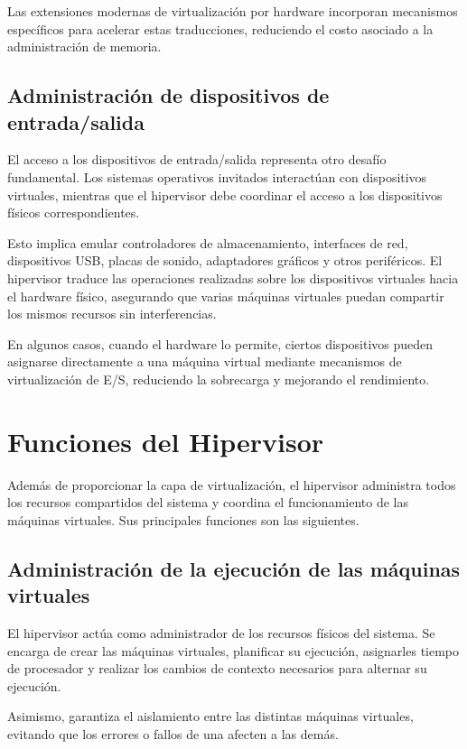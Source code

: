 Las extensiones modernas de virtualización por hardware incorporan mecanismos específicos para acelerar estas traducciones, reduciendo el costo asociado a la administración de memoria.

\subsection{Administración de dispositivos de entrada/salida}

El acceso a los dispositivos de entrada/salida representa otro desafío fundamental. Los sistemas operativos invitados interactúan con dispositivos virtuales, mientras que el hipervisor debe coordinar el acceso a los dispositivos físicos correspondientes.

Esto implica emular controladores de almacenamiento, interfaces de red, dispositivos USB, placas de sonido, adaptadores gráficos y otros periféricos. El hipervisor traduce las operaciones realizadas sobre los dispositivos virtuales hacia el hardware físico, asegurando que varias máquinas virtuales puedan compartir los mismos recursos sin interferencias.

En algunos casos, cuando el hardware lo permite, ciertos dispositivos pueden asignarse directamente a una máquina virtual mediante mecanismos de virtualización de E/S, reduciendo la sobrecarga y mejorando el rendimiento.

\section{Funciones del Hipervisor}

Además de proporcionar la capa de virtualización, el hipervisor administra todos los recursos compartidos del sistema y coordina el funcionamiento de las máquinas virtuales. Sus principales funciones son las siguientes.

\subsection{Administración de la ejecución de las máquinas virtuales}

El hipervisor actúa como administrador de los recursos físicos del sistema. Se encarga de crear las máquinas virtuales, planificar su ejecución, asignarles tiempo de procesador y realizar los cambios de contexto necesarios para alternar su ejecución.

Asimismo, garantiza el aislamiento entre las distintas máquinas virtuales, evitando que los errores o fallos de una afecten a las demás.

